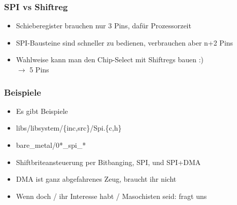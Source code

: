\documentclass[ngerman,compress]{beamer}
\begin{document}
\begin{frame} [fragile]
	\frametitle{SPI vs Shiftreg}
	\begin{itemize}
		\item Schieberegister brauchen nur 3 Pins, dafür Prozessorzeit
		\item SPI-Bausteine sind schneller zu bedienen, verbrauchen aber n+2 Pins
		\item Wahlweise kann man den Chip-Select mit Shiftregs bauen :) \\ $\rightarrow$ 5 Pins
	\end{itemize}
\end{frame}

\begin{frame} [fragile]
	\frametitle{Beispiele}
	\begin{itemize}
		\item Es gibt Beispiele
                \item libs/libsystem/\{inc,src\}/Spi.\{c,h\}
		\item bare\_metal/0*\_spi\_*
		\item Shiftbriteansteuerung per Bitbanging, SPI, und SPI+DMA
		\pause
		\item DMA ist ganz abgefahrenes Zeug, braucht ihr nicht
		\item Wenn doch / ihr Interesse habt / Masochisten seid: fragt uns
	\end{itemize}
\end{frame}
\end{document}
